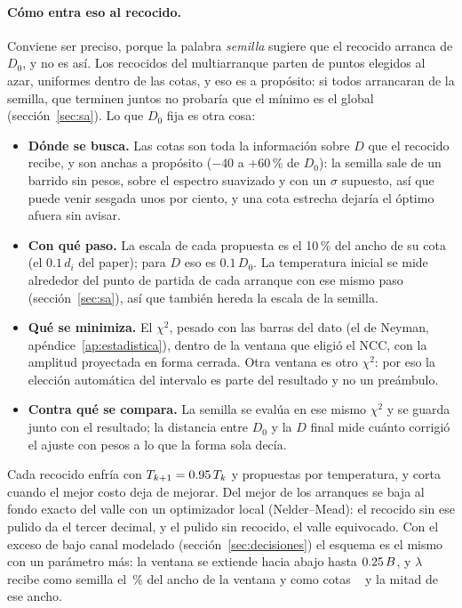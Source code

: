 \documentclass[11pt,a4paper]{article}
\begin{document}
\paragraph{Cómo entra eso al recocido.} Conviene ser preciso, porque la palabra
\emph{semilla} sugiere que el recocido arranca de $D_0$, y no es así. Los
\NArranques{} recocidos del multiarranque parten de puntos elegidos al azar,
uniformes dentro de las cotas, y eso es a propósito: si todos arrancaran de la
semilla, que terminen juntos no probaría que el mínimo es el global
(sección~\ref{sec:sa}). Lo que $D_0$ fija es otra cosa:
\begin{itemize}
\item \textbf{Dónde se busca.} Las cotas son toda la información sobre $D$ que
      el recocido recibe, y son anchas a propósito ($-40$ a $+60$\,\% de
      $D_0$): la semilla sale de un barrido sin pesos, sobre el espectro
      suavizado y con un $\sigma$ supuesto, así que puede venir sesgada unos
      por ciento, y una cota estrecha dejaría el óptimo afuera sin avisar.
\item \textbf{Con qué paso.} La escala de cada propuesta es el 10\,\% del
      ancho de su cota (el $0.1\,d_i$ del paper); para $D$ eso es $0.1\,D_0$.
      La temperatura inicial se mide alrededor del punto de partida de cada
      arranque con ese mismo paso (sección~\ref{sec:sa}), así que también
      hereda la escala de la semilla.
\item \textbf{Qué se minimiza.} El $\chi^2$, pesado con las barras del dato
      (el de Neyman, apéndice~\ref{ap:estadistica}), dentro de la ventana que
      eligió el NCC, con la amplitud proyectada en forma cerrada. Otra ventana
      es otro $\chi^2$: por eso la elección automática del intervalo es parte
      del resultado y no un preámbulo.
\item \textbf{Contra qué se compara.} La semilla se evalúa en ese mismo
      $\chi^2$ y se guarda junto con el resultado; la distancia entre $D_0$ y
      la $D$ final mide cuánto corrigió el ajuste con pesos a lo que la forma
      sola decía.
\end{itemize}
Cada recocido enfría con $T_{k+1} = 0.95\,T_k$ y \NMarkov{} propuestas por
temperatura, y corta cuando el mejor costo deja de mejorar. Del mejor de los
\NArranques{} arranques se baja al fondo exacto del valle con un optimizador
local (Nelder--Mead): el recocido sin ese pulido da el tercer decimal, y el
pulido sin recocido, el valle equivocado. Con el exceso de bajo canal modelado
(sección~\ref{sec:decisiones}) el esquema es el mismo con un parámetro más:
la ventana se extiende hacia abajo hasta $0.25\,B$, y $\lambda$
recibe como semilla el \LambdaSemillaRel\,\% del ancho de la ventana y como
cotas \CotaLambdaMin~\mVns{} y la mitad de ese ancho.
\end{document}
